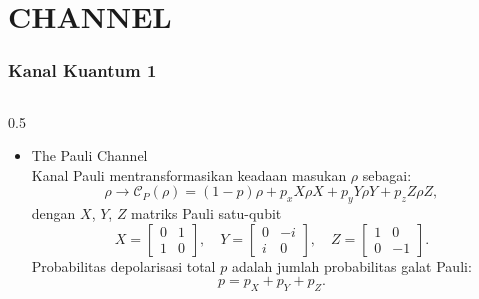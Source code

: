 \section{CHANNEL}

\begin{frame}
    \frametitle{Kanal Kuantum 1}
    \begin{columns}[T]
        \begin{column}{0.5\textwidth}\vspace{-0.5cm}
            \small\justifying
            \begin{itemize}
                \item The Pauli Channel \\
                    {\fontsize{4}{6}\selectfont\justifying
                    Kanal Pauli mentransformasikan keadaan masukan $\rho$
                    sebagai:
                    \begin{equation}
                        \rho \rightarrow \mathcal{C}_P(\rho)
                        = (1-p)\rho + p_x X\rho X + p_y Y\rho Y + p_z Z\rho Z,
                    \end{equation}
                    dengan $X$, $Y$, $Z$ matriks Pauli satu-qubit
                    \begin{equation}
                        X=\begin{bmatrix}0&1\\1&0\end{bmatrix},\quad
                        Y=\begin{bmatrix}0&-i\\ i&0\end{bmatrix},\quad
                        Z=\begin{bmatrix}1&0\\0&-1\end{bmatrix}.
                    \end{equation}
                    Probabilitas depolarisasi total $p$ adalah jumlah
                    probabilitas galat Pauli:
                    \begin{equation}
                        p=p_X+p_Y+p_Z.
                    \end{equation}
}
\end{itemize}
\end{column}
\end{columns}
\end{frame}
